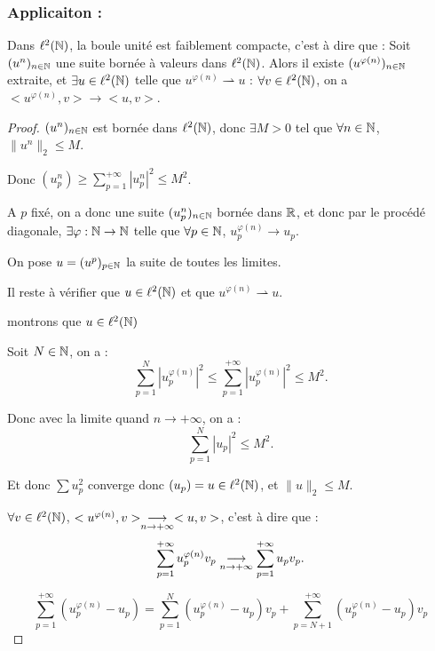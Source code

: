 \subsubsection{Applicaiton : }

\begin{theoreme}{}{}
    Dans $\ell^2(\mathbb{N})$, la boule unité est faiblement compacte, c'est à dire que : 
    Soit $(u^n)_{n \in \mathbb{N}}$ une suite bornée à valeurs dans $\ell^2(\mathbb{N})$. Alors il existe 
    $(u^{\varphi(n)})_{n \in \mathbb{N}}$ extraite, et $\exists u \in \ell^2(\mathbb{N})$ telle que $u^{\varphi(n)} \rightharpoonup u$ : 
    $\forall v \in \ell^2(\mathbb{N})$, on a $<u^{\varphi(n)}, v> \to <u, v>$.
\end{theoreme}

\begin{proof}
    $(u^n)_{n \in \mathbb{N}}$ est bornée dans $\ell^2(\mathbb{N})$, donc $\exists M > 0$ tel que $\forall n \in \mathbb{N}$,
    $\|u^n\|_2 \leqslant M$.

    Donc $\displaystyle (u_p^n) \geqslant \sum_{p = 1}^{+\infty} |u_p^n|^2 \leqslant M^2$. 

    A $p$ fixé, on a donc une suite $(u_p^n)_{n \in \mathbb{N}}$ bornée dans $\mathbb{R}$, et donc par le procédé diagonale, 
    $\exists \varphi : \mathbb{N} \to \mathbb{N}$ telle que $\forall p \in \mathbb{N}$, $u_p^{\varphi(n)} \to u_p$. 

    On pose $u = (u^p)_{p \in \mathbb{N}}$ la suite de toutes les limites.

    Il reste à vérifier que $u \in \ell^2(\mathbb{N})$ et que $u^{\varphi(n)} \rightharpoonup u$.

     montrons que $u \in \ell^2(\mathbb{N})$

    \svspace Soit $N \in \mathbb{N}$, on a :
    \[    \sum_{p = 1}^{N} |u_p^{\varphi(n)}|^2 \leqslant \sum_{p = 1 }^{+ \infty } |u_p^{\varphi(n)}|^2 \leqslant M^2. \]

    Donc avec la limite quand $n \to + \infty$, on a : 
    \[    \sum_{p = 1}^{N} |u_p|^2 \leqslant M^2. \]

    Et donc $\sum u_p^2$ converge donc $(u_p) = u \in \ell^2(\mathbb{N})$, et $\|u\|_2 \leqslant M$.

     $\forall v \in \ell^2(\mathbb{N})$, $<u^{\varphi(n)}, v> \underset{n \to + \infty}{\longrightarrow} <u, v>$, c'est à dire que : 
    \[    \sum_{p = 1}^{+ \infty} u_p^{\varphi(n)} v_p \underset{n \to + \infty}{\longrightarrow} \sum_{p = 1}^{+ \infty} u_p v_p. \]

    $$\sum_{p = 1 }^{+ \infty} (u_p^{\varphi(n)} - u_p) = \sum_{p = 1}^{N} (u_p^{\varphi(n)} - u_p)v_p + \sum_{p = N + 1}^{+ \infty} (u_p^{\varphi(n)} - u_p)v_p$$


\end{proof}
